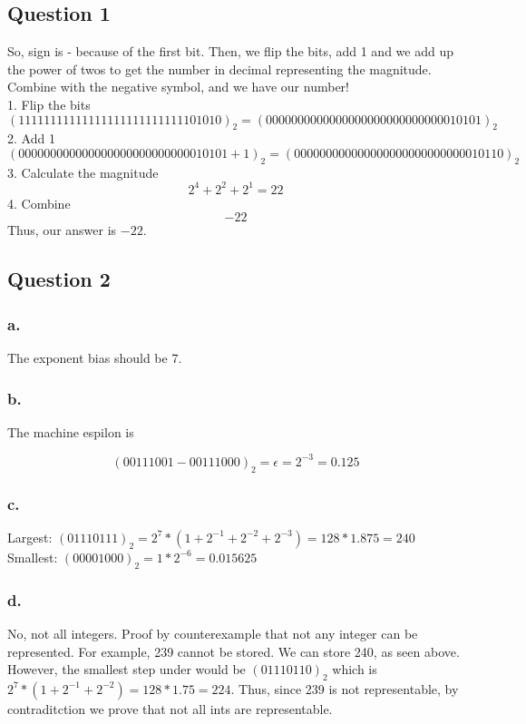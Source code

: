 \documentclass[12pt,a4paper]{article}
\begin{document}
\subsection*{Question 1}
So, sign is - because of the first bit. Then, we flip the bits, add 1 and we add up the power of twos to get the number in decimal representing the magnitude. Combine with the negative symbol, and we have our number!
\\ 
1. Flip the bits
$$(11111111111111111111111111101010)_2 = (0000000000000000000000000000010101)_2$$
2. Add 1
$$(000000000000000000000000000010101 + 1)_2 = (000000000000000000000000000010110)_2 $$
3. Calculate the magnitude 
$$2^4 + 2^2 + 2^1 = 22$$
4. Combine
$$-22$$
\newline
Thus, our answer is $-22$.
\vfill
\newpage

\subsection*{Question 2}

\subsubsection*{a.}
The exponent bias should be 7.



\subsubsection*{b.}
The machine espilon is 

$$(0 0111 001 - 0 0111 000)_2 = \epsilon = 2^{-3} = 0.125$$

\subsubsection*{c. }

Largest: $(0 1110 111)_2 = 2^7 * (1 + 2^{-1} + 2^{-2} + 2^{-3}) = 128 * 1.875 = 240$
\newline
Smallest: $(0 0001 000)_2 = 1 * 2^{-6} = 0.015625$



\subsubsection*{d. }
No, not all integers. Proof by counterexample that not any integer can be represented. For example, 239 cannot be stored.
We can store 240, as seen above. However, the smallest step under would be $(0 1110 110)_2$
which is $2^7 * (1 + 2^{-1} + 2^{-2}) = 128 * 1.75 = 224$.
\newline
Thus, since 239 is not representable, by contraditction we prove that not all ints are representable.
\end{document}
